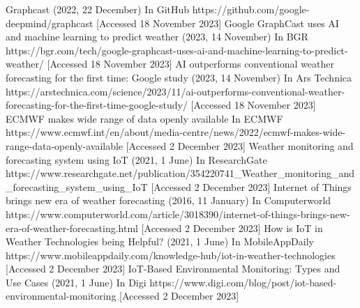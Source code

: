 \documentclass[../paper.tex]{subfiles}
\begin{document}
\begin{thebibliography}{00}
     Graphcast (2022, 22 December) In GitHub https://github.com/google-deepmind/graphcast [Accessed 18 November 2023]
     Google GraphCast uses AI and machine learning to predict weather (2023, 14 November) In BGR https://bgr.com/tech/google-graphcast-uses-ai-and-machine-learning-to-predict-weather/ [Accessed 18 November 2023]
     AI outperforms conventional weather forecasting for the first time: Google study (2023, 14 November) In Ars Technica https://arstechnica.com/science/2023/11/ai-outperforms-conventional-weather-forecasting-for-the-first-time-google-study/ [Accessed 18 November 2023]
     ECMWF makes wide range of data openly available In ECMWF https://www.ecmwf.int/en/about/media-centre/news/2022/ecmwf-makes-wide-range-data-openly-available [Accessed 2 December 2023]
     Weather monitoring and forecasting system using IoT (2021, 1 June) In ResearchGate https://www.researchgate.net/publication/354220741\_Weather\_monitoring\_and\_forecasting\_system\_using\_IoT [Accessed 2 December 2023]
     Internet of Things brings new era of weather forecasting (2016, 11 January) In Computerworld https://www.computerworld.com/article/3018390/internet-of-things-brings-new-era-of-weather-forecasting.html [Accessed 2 December 2023]
     How is IoT in Weather Technologies being Helpful?
    (2021, 1 June) In MobileAppDaily https://www.mobileappdaily.com/knowledge-hub/iot-in-weather-technologies [Accessed 2 December 2023]
     IoT-Based Environmental Monitoring: Types and Use Cases (2021, 1 June) In Digi https://www.digi.com/blog/post/iot-based-environmental-monitoring [Accessed 2 December 2023]
\end{thebibliography}
\end{document}

